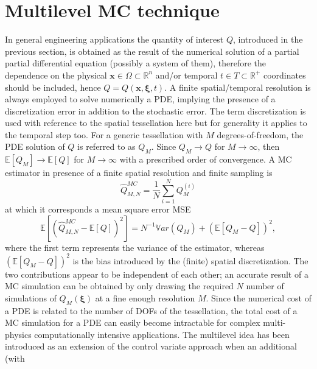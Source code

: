 \section{Multilevel MC technique} \label{uq:sampling:multilevel}
In general engineering applications the quantity of interest $Q$, introduced in the previous section, is obtained
as the result of the numerical solution of a partial partial differential equation (possibly a system of them), 
therefore the dependence on the 
physical $\mathbf{x} \in \Omega\subset\mathbb{R}^n$ and/or temporal $t \in T\subset\mathbb{R^+}$ coordinates should be included, 
hence $Q=Q(\mathbf{x}, \boldsymbol{\xi}, t)$. A finite spatial/temporal resolution is always employed to solve numerically a PDE, implying
the presence of a discretization error in addition to the stochastic error. The term discretization is used with reference 
to the spatial tessellation here but for generality it applies to the temporal step too. For a generic tessellation with $M$ 
degrees-of-freedom, the PDE solution of $Q$ is referred to as $Q_M$. Since $Q_M \rightarrow Q$ for $M\rightarrow\infty$, 
then $\mathbb{E}\left[{Q_M}\right] \rightarrow \mathbb{E}\left[{Q}\right]$ for $M\rightarrow\infty$ with a prescribed order of convergence. 
A MC estimator in presence of a finite spatial resolution and finite sampling is
\begin{equation}
\hat{Q}^{MC}_{M,N} = \frac{1}{N} \sum_{i=1}^N Q_M^{(i)}
\end{equation}
at which it corresponds a mean square error MSE  
\begin{equation}
\mathbb{E}\left[ (\hat{Q}^{MC}_{M,N}-\mathbb{E}\left[ Q \right] )^2 \right]
       = N^{-1} \mathbb{V}ar\left({Q_M}\right) + \left( \mathbb{E}\left[{ Q_M-Q }\right] \right)^2,
\end{equation}
where the first term represents the variance of the estimator, whereas $\left( \mathbb{E}\left[ Q_M-Q \right] \right)^2$ is the bias
introduced by the (finite) spatial discretization. The two contributions appear to be independent of each other; an accurate
result of a MC simulation can be obtained by only drawing the required $N$ number of simulations of $Q_M( \boldsymbol{\xi} )$ at 
a fine enough resolution $M$. Since the numerical cost of a PDE is related to the number of DOFs of the tessellation,
the total cost of a MC simulation for a PDE can easily become intractable for complex multi-physics computationally 
intensive applications.
The multilevel idea has been introduced as an extension of the control variate approach when an additional (with
